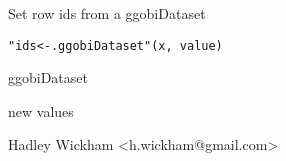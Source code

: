 \begin{Description}\relax
Set row ids from a ggobiDataset
\end{Description}
\begin{Usage}
\begin{verbatim}"ids<-.ggobiDataset"(x, value)\end{verbatim}
\end{Usage}
\begin{Arguments}
\begin{ldescription}
\item[\code{x}] ggobiDataset
\item[\code{value}] new values
\end{ldescription}
\end{Arguments}
\begin{Details}\relax
\end{Details}
\begin{Author}\relax
Hadley Wickham <h.wickham@gmail.com>
\end{Author}
\begin{SeeAlso}\relax
{}
\end{SeeAlso}
\begin{Examples}
\begin{ExampleCode}\end{ExampleCode}
\end{Examples}

